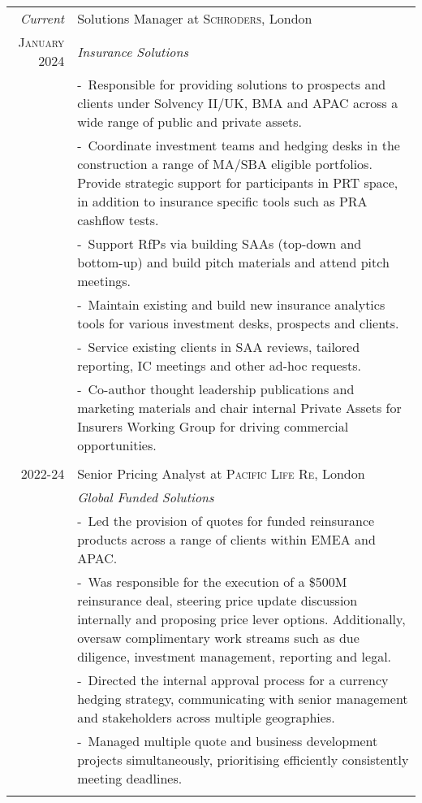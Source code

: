 \documentclass[a4paper,10pt]{article}
\newcommand{\blankline}{\multicolumn{1}{c}{}\\}
\newcommand{\projectitem}{\footnotesize-~\ignorespaces}
\begin{document}
\begin{tabularx}{\textwidth}{@{}r|>{\raggedright\arraybackslash}X@{}}
  \emph{Current} &Solutions Manager at \textsc{Schroders}, London \\
 \textsc{January 2024} & \emph{Insurance Solutions}\\
& \projectitem Responsible for providing solutions to prospects and clients under Solvency II/UK, BMA and APAC across a wide range of public and private assets.\\
 & \projectitem Coordinate investment teams and hedging desks in the construction a range of MA/SBA eligible portfolios. Provide strategic support for participants in PRT space, in addition to insurance specific tools such as PRA cashflow tests.\\
 & \projectitem Support RfPs via building SAAs (top-down and bottom-up) and build pitch materials and attend pitch meetings.\\
 & \projectitem Maintain existing and build new insurance analytics tools for various investment desks, prospects and clients.\\
 & \projectitem Service existing clients in SAA reviews, tailored reporting, IC meetings and other ad-hoc requests.\\
  & \projectitem Co-author thought leadership publications and marketing materials and chair internal Private Assets for Insurers Working Group for driving commercial opportunities. \\
  \blankline

\textsc{2022-24} & Senior Pricing Analyst at \textsc{Pacific Life Re}, London \\
 & \emph{Global Funded Solutions}\\
 & \projectitem Led the provision of quotes for funded reinsurance products across a range of clients within EMEA and APAC. \\
  & \projectitem Was responsible for the execution of a \$500M reinsurance deal, steering price update discussion internally and proposing price lever options. Additionally, oversaw complimentary work streams such as due diligence, investment management, reporting and legal.\\
  & \projectitem Directed the internal approval process for a currency hedging strategy, communicating with senior management and stakeholders across multiple geographies. \\
  & \projectitem Managed multiple quote and business development projects simultaneously, prioritising efficiently consistently meeting deadlines.\\
  \blankline


\end{tabularx}
\end{document}
